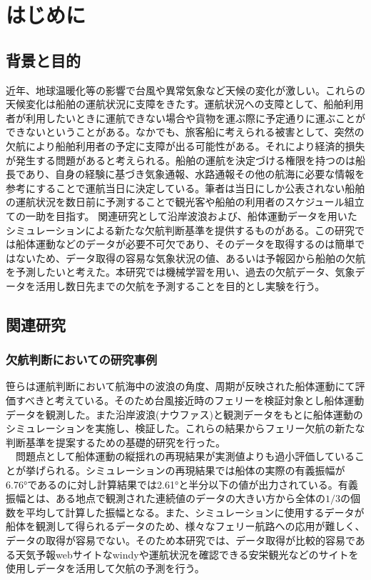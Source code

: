 


\chapter{はじめに}
\label{chap:introduction}





\section{背景と目的}
近年、地球温暖化等の影響で台風や異常気象など天候の変化が激しい\cite{earth}。これらの天候変化は船舶の運航状況に支障をきたす。運航状況への支障として、船舶利用者が利用したいときに運航できない場合や貨物を運ぶ際に予定通りに運ぶことができないということがある。なかでも、旅客船に考えられる被害として、突然の欠航により船舶利用者の予定に支障が出る可能性がある。それにより経済的損失が発生する問題があると考えられる。船舶の運航を決定づける権限を持つのは船長であり、自身の経験に基づき気象通報、水路通報その他の航海に必要な情報を参考にすることで運航当日に決定している\cite{stan}。筆者は当日にしか公表されない船舶の運航状況を数日前に予測することで観光客や船舶の利用者のスケジュール組立ての一助を目指す。
関連研究として沿岸波浪および、船体運動データを用いたシミュレーションによる新たな欠航判断基準を提供するものがある\cite{Related-Research1}。この研究では船体運動などのデータが必要不可欠であり、そのデータを取得するのは簡単ではないため、データ取得の容易な気象状況の値、あるいは予報図から船舶の欠航を予測したいと考えた。本研究では機械学習を用い、過去の欠航データ、気象データを活用し数日先までの欠航を予測することを目的とし実験を行う。

\section{関連研究}
\subsection{欠航判断においての研究事例}
笹\cite{Related-Research1}らは運航判断において航海中の波浪の角度、周期が反映された船体運動にて評価すべきと考えている。そのため台風接近時のフェリーを検証対象とし船体運動データを観測した。また沿岸波浪(ナウファス)\cite{nowphas}と観測データをもとに船体運動のシミュレーションを実施し、検証した。これらの結果からフェリー欠航の新たな判断基準を提案するための基礎的研究を行った。
\\　問題点として船体運動の縦揺れの再現結果が実測値よりも過小評価していることが挙げられる。シミュレーションの再現結果では船体の実際の有義振幅が6.76°であるのに対し計算結果では2.61°と半分以下の値が出力されている。有義振幅とは、ある地点で観測された連続値のデータの大きい方から全体の$1/3$の個数を平均して計算した振幅となる。また、シミュレーションに使用するデータが船体を観測して得られるデータのため、様々なフェリー航路への応用が難しく、データの取得が容易でない。そのため本研究では、データ取得が比較的容易である天気予報webサイトなwindy\cite{windy}や運航状況を確認できる安栄観光\cite{anei}などのサイトを使用しデータを活用して欠航の予測を行う。

